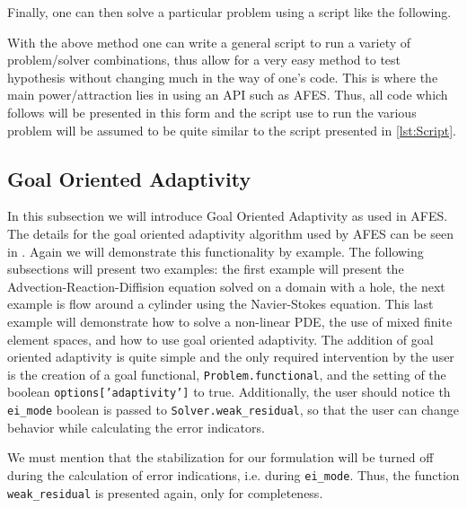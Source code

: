     Finally, one can then solve a particular problem using a script like the
    following.
    

    With the above method one can write a general script to run a variety of
    problem/solver combinations, thus allow for a very easy method to test
    hypothesis without changing much in the way of one's code. This is where the
    main power/attraction lies in using an API such as AFES. Thus, all code
    which follows will be presented in this form and the script use to run the
    various problem will be assumed to be quite similar to the script presented
    in \autoref{lst:Script}.

\subsection{Goal Oriented Adaptivity} \label{sse:Adaptivity}

    In this subsection we will introduce Goal Oriented Adaptivity as used in
    AFES.  The details for the goal oriented adaptivity algorithm used by AFES
    can be seen in \cite{Foster2014e,Jansson2014a,Jansson2014b}. Again we will
    demonstrate this functionality by example. The following subsections will
    present two examples: the first example will present the
    Advection-Reaction-Diffision equation solved on a domain with a hole, the
    next example is flow around a cylinder using the Navier-Stokes equation.
    This last example will demonstrate how to solve a non-linear PDE, the use of
    mixed finite element spaces, and how to use goal oriented adaptivity.  The
    addition of goal oriented adaptivity is quite simple and the only required
    intervention by the user is the creation of a goal functional,
    \texttt{Problem.functional}, and the setting of the boolean
    \texttt{options['adaptivity']} to true.  Additionally, the user should
    notice th  \texttt{ei\_mode} boolean is passed to
    \texttt{Solver.weak\_residual}, so that the user can change behavior while
    calculating the error indicators.

    \begin{remark}
        We must mention that the stabilization for our formulation will be
        turned off during the calculation of error indications, i.e. during
        \texttt{ei\_mode}. Thus, the function \texttt{weak\_residual} is
        presented again, only for completeness.
    \end{remark}

